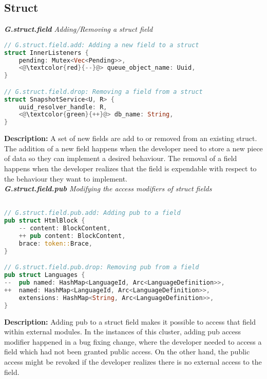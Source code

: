 \subsection{Struct} 
\noindent \textit{ \textbf{G.struct.field} Adding/Removing a struct field}

\begin{lstlisting}[language=Rust, style=colouredRust]
// G.struct.field.add: Adding a new field to a struct
struct InnerListeners {
    pending: Mutex<Vec<Pending>>,
    <@\textcolor{red}{--}@> queue_object_name: Uuid,
}

// G.struct.field.drop: Removing a field from a struct
struct SnapshotService<U, R> {
    uuid_resolver_handle: R,
    <@\textcolor{green}{++}@> db_name: String,
}
\end{lstlisting}

\noindent \textbf{Description:} A set of new fields are add to or removed from an existing struct. The addition of a new field happens when the developer need to store a new piece of data so they can implement a desired behaviour. The removal of a field  happens when the developer realizes that the field is expendable with respect to the behaviour they want to implement. \\

\noindent \textit{ \textbf{G.struct.field.pub} Modifying the access modifiers of struct fields}

\begin{lstlisting}[language=Rust, style=colouredRust]

// G.struct.field.pub.add: Adding pub to a field
pub struct HtmlBlock {
    -- content: BlockContent,
    ++ pub content: BlockContent,
    brace: token::Brace,
} 

// G.struct.field.pub.drop: Removing pub from a field
pub struct Languages {
--  pub named: HashMap<LanguageId, Arc<LanguageDefinition>>,
++  named: HashMap<LanguageId, Arc<LanguageDefinition>>,
    extensions: HashMap<String, Arc<LanguageDefinition>>,
}

\end{lstlisting}

\noindent \textbf{Description:} Adding pub to a struct field makes it possible to access that field within external modules. In the instances of this cluster, adding pub access modifier happened in a bug fixing change, where the developer needed to access a field which had not been granted public access. On the other hand, the public access might be revoked if the developer realizes there is no external access to the field.

